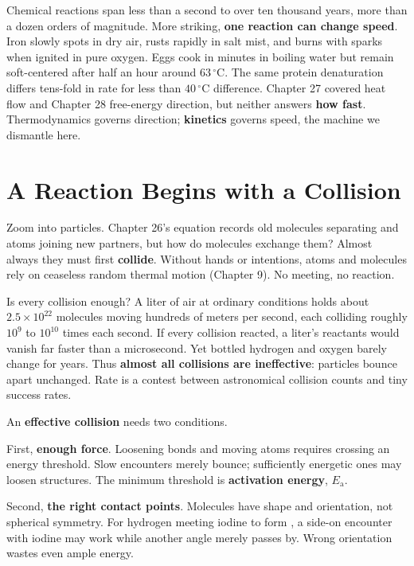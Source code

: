 Chemical reactions span less than a second to over ten thousand years, more than a dozen orders of magnitude. More striking, \textbf{one reaction can change speed}. Iron slowly spots in dry air, rusts rapidly in salt mist, and burns with sparks when ignited in pure oxygen. Eggs cook in minutes in boiling water but remain soft-centered after half an hour around $63\,^{\circ}\mathrm{C}$. The same protein denaturation differs tens-fold in rate for less than $40\,^{\circ}\mathrm{C}$ difference. Chapter 27 covered heat flow and Chapter 28 free-energy direction, but neither answers \textbf{how fast}. Thermodynamics governs direction; \textbf{kinetics} governs speed, the machine we dismantle here.

\section{A Reaction Begins with a Collision}

Zoom into particles. Chapter 26's equation records old molecules separating and atoms joining new partners, but how do molecules exchange them? Almost always they must first \textbf{collide}. Without hands or intentions, atoms and molecules rely on ceaseless random thermal motion (Chapter 9). No meeting, no reaction.

Is every collision enough? A liter of air at ordinary conditions holds about $2.5\times 10^{22}$ molecules moving hundreds of meters per second, each colliding roughly $10^{9}$ to $10^{10}$ times each second. If every collision reacted, a liter's reactants would vanish far faster than a microsecond. Yet bottled hydrogen and oxygen barely change for years. Thus \textbf{almost all collisions are ineffective}: particles bounce apart unchanged. Rate is a contest between astronomical collision counts and tiny success rates.

An \textbf{effective collision} needs two conditions.

First, \textbf{enough force}. Loosening bonds and moving atoms requires crossing an energy threshold. Slow encounters merely bounce; sufficiently energetic ones may loosen structures. The minimum threshold is \textbf{activation energy}, $E_{\mathrm{a}}$.

Second, \textbf{the right contact points}. Molecules have shape and orientation, not spherical symmetry. For hydrogen meeting iodine to form , a side-on encounter with iodine may work while another angle merely passes by. Wrong orientation wastes even ample energy.

